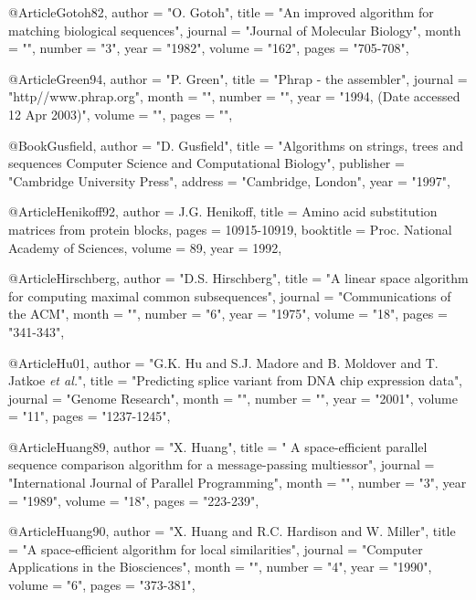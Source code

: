 @Article{Gotoh82,
   author =   "O. Gotoh",
   title =   "An improved algorithm for matching biological sequences",
   journal =   "Journal of Molecular Biology",
   month = "",
   number = "3",
   year =   "1982",
   volume =   "162",
   pages =   "705-708",
}

@Article{Green94,
   author =   "P. Green",
   title =   "Phrap - the assembler",
   journal =   "http//www.phrap.org",
   month = "",
   number = "",
   year =   "1994, (Date accessed 12 Apr 2003)",
   volume =   "",
   pages =   "",
}

@Book{Gusfield,
  author =   "D. Gusfield",
  title =    "Algorithms on strings, trees and sequences \uppercase{C}omputer
                  \uppercase{S}cience and \uppercase{C}omputational \uppercase{B}iology",
  publisher =    "Cambridge University Press",
  address   =    "Cambridge, London",
  year =     "1997",
}


@Article{Henikoff92,
  author =       {J.G. Henikoff},
  title =        {Amino acid substitution matrices from protein blocks},
  pages =        {10915-10919},
  booktitle =    {Proc. National Academy of Sciences},
  volume =       {89},
  year =         {1992},
}

@Article{Hirschberg,
   author =   "D.S. Hirschberg",
   title =   "A linear space algorithm for computing maximal common subsequences",
   journal =   "Communications of the ACM",
   month = "",
   number = "6",
   year =   "1975",
   volume =   "18",
   pages =   "341-343",
}


@Article{Hu01,
   author =   "G.K. Hu and S.J. Madore and B. Moldover and T. Jatkoe {\it et al.}",
   title =   "Predicting splice variant from {DNA} chip expression data",
   journal =   "Genome Research",
   month = "",
   number = "",
   year =   "2001",
   volume =   "11",
   pages =   "1237-1245",
}

@Article{Huang89,
   author =   "X. Huang",
   title =   " A space-efficient parallel sequence
        comparison algorithm for a message-passing multiessor",
   journal =   "International Journal of Parallel Programming",
   month = "",
   number = "3",
   year =   "1989",
   volume =   "18",
   pages =   "223-239",
}

@Article{Huang90,
   author =   "X. Huang and R.C. Hardison and W. Miller",
   title =   "A space-efficient algorithm for local similarities",
   journal =   "Computer Applications in the Biosciences",
   month = "",
   number = "4",
   year =   "1990",
   volume =   "6",
   pages =   "373-381",
}


